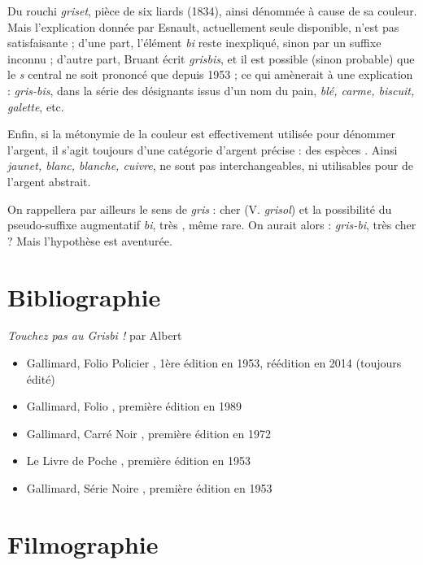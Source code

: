 Du rouchi \emph{griset}, \og pièce de six liards \fg{} (1834), ainsi dénommée à cause de sa couleur. Mais l'explication donnée par Esnault, actuellement seule 
disponible, n'est pas satisfaisante ; d'une part, l'élément \emph{bi} reste
inexpliqué, sinon par un \og suffixe \fg{} inconnu ; d'autre part, Bruant écrit
\emph{grisbis}, et il est possible (sinon probable) que le \emph{s} central ne
soit prononcé que depuis 1953 ; ce qui amènerait à une explication :
\emph{gris-bis}, dans la série des désignants issus d'un nom du pain,
\emph{blé, carme, biscuit, galette}, etc.

Enfin, si la métonymie de la couleur est effectivement utilisée pour dénommer
l'argent, il s'agit toujours d'une catégorie d'argent précise : des \og espèces \fg{}.
Ainsi \emph{jaunet, blanc, blanche, cuivre}, ne sont pas interchangeables, ni 
utilisables pour \og de l'argent \fg{} abstrait.

On rappellera par ailleurs le sens de \emph{gris} : \og cher \fg{} (V. \emph{grisol}) et la possibilité du pseudo-suffixe augmentatif \emph{bi}, \og très \fg{}, même rare. On aurait alors : \emph{gris-bi}, \og très cher \fg{} ? Mais l'hypothèse est aventurée.


\section{Bibliographie\label{preamble-biblio}}


\emph{Touchez pas au Grisbi !} par Albert 

\begin{itemize}
	\item Gallimard, Folio Policier , 1ère édition en 1953, réédition en 2014 (toujours édité)
	\item Gallimard, Folio , première édition en 1989
	\item Gallimard, Carré Noir , première édition en 1972
	\item Le Livre de Poche , première édition en 1953
	\item Gallimard, Série Noire , première édition en 1953
\end{itemize}


\section{Filmographie\label{preamble-filmography}}



